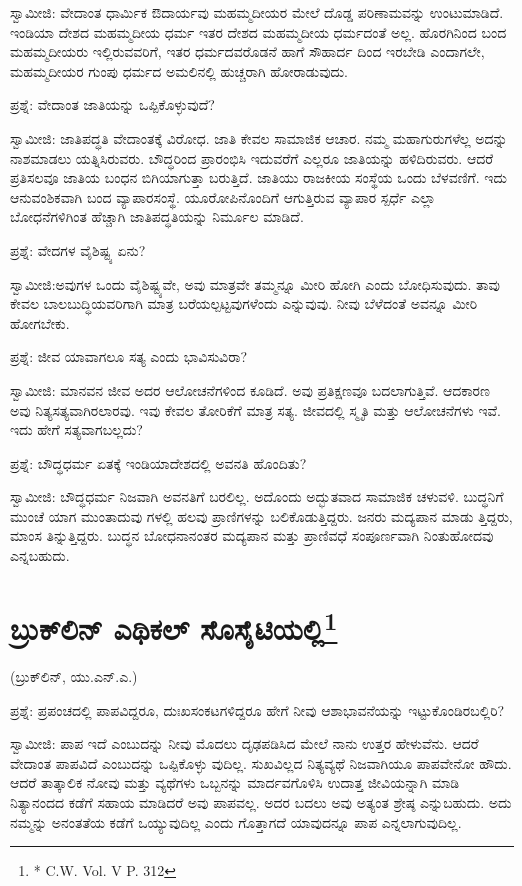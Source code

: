 ಸ್ವಾಮೀಜಿ: ವೇದಾಂತ ಧಾರ್ಮಿಕ ಔದಾರ್ಯವು ಮಹಮ್ಮದೀಯರ ಮೇಲೆ ದೊಡ್ಡ ಪರಿಣಾಮವನ್ನು ಉಂಟುಮಾಡಿದೆ. ಇಂಡಿಯಾ ದೇಶದ ಮಹಮ್ಮದೀಯ ಧರ್ಮ ಇತರ ದೇಶದ ಮಹಮ್ಮದೀಯ ಧರ್ಮದಂತೆ ಅಲ್ಲ. ಹೊರಗಿನಿಂದ ಬಂದ ಮಹಮ್ಮದೀಯರು ಇಲ್ಲಿರುವವರಿಗೆ, ಇತರ ಧರ್ಮದವರೊಡನೆ ಹಾಗೆ ಸೌಹಾರ್ದ ದಿಂದ ಇರಬೇಡಿ ಎಂದಾಗಲೇ, ಮಹಮ್ಮದೀಯರ ಗುಂಪು ಧರ್ಮದ ಅಮಲಿನಲ್ಲಿ ಹುಚ್ಚರಾಗಿ ಹೋರಾಡುವುದು.

ಪ್ರಶ್ನೆ: ವೇದಾಂತ ಜಾತಿಯನ್ನು ಒಪ್ಪಿಕೊಳ್ಳುವುದೆ?

ಸ್ವಾಮೀಜಿ: ಜಾತಿಪದ್ಧತಿ ವೇದಾಂತಕ್ಕೆ ವಿರೋಧ. ಜಾತಿ ಕೇವಲ ಸಾಮಾಜಿಕ ಆಚಾರ. ನಮ್ಮ ಮಹಾಗುರುಗಳೆಲ್ಲ ಅದನ್ನು ನಾಶಮಾಡಲು ಯತ್ನಿಸಿರುವರು. ಬೌದ್ಧರಿಂದ ಪ್ರಾರಂಭಿಸಿ ಇದುವರೆಗೆ ಎಲ್ಲರೂ ಜಾತಿಯನ್ನು ಹಳಿದಿರುವರು. ಆದರೆ ಪ್ರತಿಸಲವೂ ಜಾತಿಯ ಬಂಧನ ಬಿಗಿಯಾಗುತ್ತಾ ಬರುತ್ತಿದೆ. ಜಾತಿಯು ರಾಜಕೀಯ ಸಂಸ್ಥೆಯ ಒಂದು ಬೆಳವಣಿಗೆ. ಇದು ಆನುವಂಶಿಕವಾಗಿ ಬಂದ ವ್ಯಾಪಾರಸಂಸ್ಥೆ. ಯೂರೋಪಿನೊಂದಿಗೆ ಆಗುತ್ತಿರುವ ವ್ಯಾಪಾರ ಸ್ಪರ್ಧೆ ಎಲ್ಲಾ ಬೋಧನೆಗಳಿಗಿಂತ ಹೆಚ್ಚಾಗಿ ಜಾತಿಪದ್ಧತಿಯನ್ನು ನಿರ್ಮೂಲ ಮಾಡಿದೆ.

ಪ್ರಶ್ನೆ: ವೇದಗಳ ವೈಶಿಷ್ಟ್ಯ ಏನು?

ಸ್ವಾಮೀಜಿ:ಅವುಗಳ ಒಂದು ವೈಶಿಷ್ಟ್ಯವೇ, ಅವು ಮಾತ್ರವೇ ತಮ್ಮನ್ನೂ ಮೀರಿ ಹೋಗಿ ಎಂದು ಬೋಧಿಸುವುದು. ತಾವು ಕೇವಲ ಬಾಲಬುದ್ಧಿಯವರಿಗಾಗಿ ಮಾತ್ರ ಬರೆಯಲ್ಪಟ್ಟವುಗಳೆಂದು ಎನ್ನುವುವು. ನೀವು ಬೆಳೆದಂತೆ ಅವನ್ನೂ ಮೀರಿ ಹೋಗಬೇಕು.

ಪ್ರಶ್ನೆ: ಜೀವ ಯಾವಾಗಲೂ ಸತ್ಯ ಎಂದು ಭಾವಿಸುವಿರಾ?

ಸ್ವಾಮೀಜಿ: ಮಾನವನ ಜೀವ ಅದರ ಆಲೋಚನೆಗಳಿಂದ ಕೂಡಿದೆ. ಅವು ಪ್ರತಿಕ್ಷಣವೂ ಬದಲಾಗುತ್ತಿವೆ. ಆದಕಾರಣ ಅವು ನಿತ್ಯಸತ್ಯವಾಗಿರಲಾರವು. ಇವು ಕೇವಲ ತೋರಿಕೆಗೆ ಮಾತ್ರ ಸತ್ಯ. ಜೀವದಲ್ಲಿ ಸ್ಮೃತಿ ಮತ್ತು ಆಲೋಚನೆಗಳು ಇವೆ. ಇದು ಹೇಗೆ ಸತ್ಯವಾಗಬಲ್ಲದು?

ಪ್ರಶ್ನೆ: ಬೌದ್ಧಧರ್ಮ ಏತಕ್ಕೆ ಇಂಡಿಯಾದೇಶದಲ್ಲಿ ಅವನತಿ ಹೊಂದಿತು?

ಸ್ವಾಮೀಜಿ: ಬೌದ್ಧಧರ್ಮ ನಿಜವಾಗಿ ಅವನತಿಗೆ ಬರಲಿಲ್ಲ. ಅದೊಂದು ಅದ್ಭುತವಾದ ಸಾಮಾಜಿಕ ಚಳುವಳಿ. ಬುದ್ಧನಿಗೆ ಮುಂಚೆ ಯಾಗ ಮುಂತಾದುವು ಗಳಲ್ಲಿ ಹಲವು ಪ್ರಾಣಿಗಳನ್ನು ಬಲಿಕೊಡುತ್ತಿದ್ದರು. ಜನರು ಮದ್ಯಪಾನ ಮಾಡು ತ್ತಿದ್ದರು, ಮಾಂಸ ತಿನ್ನುತ್ತಿದ್ದರು. ಬುದ್ಧನ ಬೋಧನಾನಂತರ ಮದ್ಯಪಾನ ಮತ್ತು ಪ್ರಾಣಿವಧೆ ಸಂಪೂರ್ಣವಾಗಿ ನಿಂತುಹೋದವು ಎನ್ನಬಹುದು.


\section{ಬ್ರುಕ್‍ಲಿನ್ ಎಥಿಕಲ್ ಸೊಸೈಟಿಯಲ್ಲಿ\protect\footnote{* C.W. Vol. V P. 312}}

\begin{center}
(ಬ್ರುಕ್​ಲಿನ್​, ಯು.ಎನ್​.ಎ.)
\end{center}

ಪ್ರಶ್ನೆ: ಪ್ರಪಂಚದಲ್ಲಿ ಪಾಪವಿದ್ದರೂ, ದುಃಖಸಂಕಟಗಳಿದ್ದರೂ ಹೇಗೆ ನೀವು ಆಶಾಭಾವನೆಯನ್ನು ಇಟ್ಟುಕೊಂಡಿರಬಲ್ಲಿರಿ?

ಸ್ವಾಮೀಜಿ: ಪಾಪ ಇದೆ ಎಂಬುದನ್ನು ನೀವು ಮೊದಲು ದೃಢಪಡಿಸಿದ ಮೇಲೆ ನಾನು ಉತ್ತರ ಹೇಳುವೆನು. ಆದರೆ ವೇದಾಂತ ಪಾಪವಿದೆ ಎಂಬುದನ್ನು ಒಪ್ಪಿಕೊಳ್ಳು ವುದಿಲ್ಲ. ಸುಖವಿಲ್ಲದ ನಿತ್ಯವ್ಯಥೆ ನಿಜವಾಗಿಯೂ ಪಾಪವೇನೋ ಹೌದು. ಆದರೆ ತಾತ್ಕಾಲಿಕ ನೋವು ಮತ್ತು ವ್ಯಥೆಗಳು ಒಬ್ಬನನ್ನು ಮಾರ್ದವಗೊಳಿಸಿ ಉದಾತ್ತ ಜೀವಿಯನ್ನಾಗಿ ಮಾಡಿ ನಿತ್ಯಾನಂದದ ಕಡೆಗೆ ಸಹಾಯ ಮಾಡಿದರೆ ಅವು ಪಾಪವಲ್ಲ. ಅದರ ಬದಲು ಅವು ಅತ್ಯಂತ ಶ್ರೇಷ್ಠ ಎನ್ನುಬಹುದು. ಅದು ನಮ್ಮನ್ನು ಅನಂತತೆಯ ಕಡೆಗೆ ಒಯ್ಯುವುದಿಲ್ಲ ಎಂದು ಗೊತ್ತಾಗದೆ ಯಾವುದನ್ನೂ ಪಾಪ ಎನ್ನಲಾಗುವುದಿಲ್ಲ.

